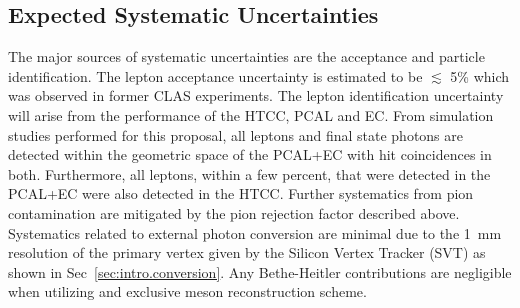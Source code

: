 \subsection{Expected Systematic Uncertainties}
The major sources of systematic uncertainties are the acceptance and particle identification. The lepton acceptance uncertainty is estimated to be $\lesssim$ 5\% which was observed in former CLAS experiments. The lepton identification uncertainty will arise from the performance of the HTCC, PCAL and EC. From simulation studies performed for this proposal, all leptons and final state photons are detected within the geometric space of the PCAL+EC with hit coincidences in both. Furthermore, all leptons, within a few percent, that were detected in the PCAL+EC were also detected in the HTCC. Further systematics from pion contamination are mitigated by the pion rejection factor described above. Systematics related to external photon conversion are minimal due to the  1~mm resolution of the primary vertex given by the Silicon Vertex Tracker (SVT) as shown in Sec~\ref{sec:intro.conversion}. Any Bethe-Heitler contributions are negligible when utilizing and exclusive meson reconstruction scheme.



